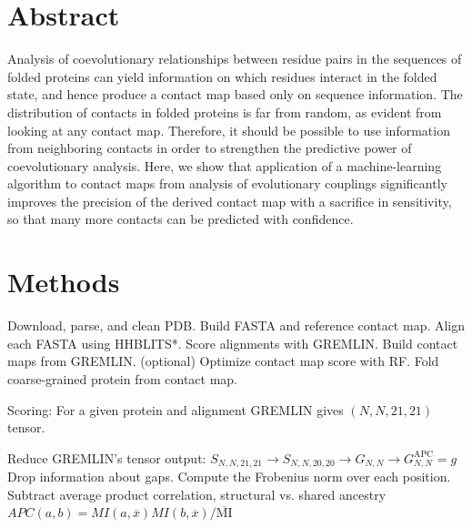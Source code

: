 \documentclass[landscape]{sciposter}
\begin{document}
\begin{multicols}{3}

\section*{Abstract}
Analysis of coevolutionary relationships between residue pairs in the sequences of folded proteins can yield information on which residues interact in the folded state, and hence produce a contact map based only on sequence information. 
The distribution of contacts in folded proteins is far from random, as evident from looking at any contact map. 
Therefore, it should be possible to use information from neighboring contacts in order to strengthen the predictive power of coevolutionary analysis. 
Here, we show that application of a machine-learning algorithm to contact maps from analysis of evolutionary couplings significantly improves the precision of the derived contact map with a sacrifice in sensitivity, so that many more contacts can be predicted with confidence. 

\vfill
\columnbreak

\section*{Methods}

Download, parse, and clean PDB.
Build FASTA and reference contact map.
Align each FASTA using HHBLITS*.
Score alignments with GREMLIN.
Build contact maps from GREMLIN.
(optional) Optimize contact map score with RF.
Fold coarse-grained protein from contact map.

Scoring: For a given protein and alignment GREMLIN gives $(N,N,21,21)$ tensor.

Reduce GREMLIN's tensor output: 
$S_{N,N,21,21} \rightarrow S_{N,N,20,20} \rightarrow  G_{N,N} \rightarrow G^{\text{APC}}_{N,N} = g$ 
Drop information about gaps.
Compute the Frobenius norm over each position. Subtract average product correlation, structural vs. shared ancestry $APC(a,b) = MI(a,\overline{x}) MI(b,\overline{x}) / \overline{\text{MI}}$


\end{multicols}
\end{document}
